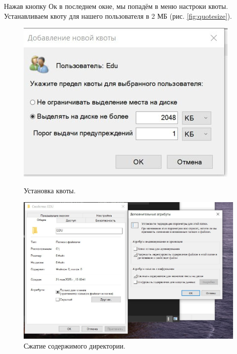 Нажав кнопку Ок в последнем окне, мы попадём в меню настроки квоты. Устанавливаем квоту для нашего пользователя в 2 МБ (рис. \ref{fig:quotesize}). 

\begin{figure}[h!]
    \centering
    \begin{minipage}[p]{0.45\linewidth}
    \centering
    \includegraphics[width=\linewidth]{Pic/lab2/photo_2025-05-21_21-19-02.jpg}
    \caption{Установка квоты.}
    \label{fig:quotesize}
    \end{minipage}
    \hfill
    \begin{minipage}[p]{0.45\linewidth}
    \centering
    \includegraphics[width=1\linewidth]{Pic/lab2/photo_2025-05-21_21-19-03.jpg}
    \caption{Сжатие содержимого директории.}
    \label{fig:zipdir}
    \end{minipage}
\end{figure}

